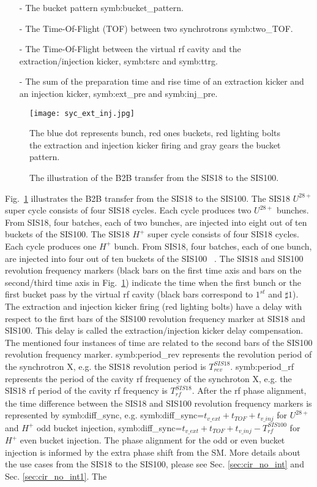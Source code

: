\begin{itemize}
\item[-] The bucket pattern \gls{symb:bucket_pattern}.
\item[-] The Time-Of-Flight (\gls{TOF}) between two synchrotrons \gls{symb:two_TOF}. 
\item[-] The Time-Of-Flight between the virtual rf cavity and the extraction/injection kicker, \gls{symb:tsrc} and \gls{symb:ttrg}. 
\item[-] The sum of the preparation time and rise time of an extraction kicker and an injection kicker, \gls{symb:ext_pre} and \gls{symb:inj_pre}.
\end{itemize}
\begin{figure}[H]
   \centering   
   \texttt{[image: syc\_ext\_inj.jpg]}
   \caption{The illustration of the B2B transfer from the SIS18 to the SIS100.}{The blue dot represents bunch, red ones buckets, red lighting bolts the extraction and injection kicker firing and gray gears the bucket pattern.}
   \label{ext_inj_kicker}
\end{figure}
Fig.~\ref{ext_inj_kicker} illustrates the B2B transfer from the SIS18 to the SIS100. The SIS18 $U^{28+}$ super cycle consists of four SIS18 cycles. Each cycle produces two $U^{28+}$ bunches. From SIS18, four batches, each of two bunches, are injected into eight out of ten buckets of the SIS100. The SIS18 $H^{+}$ super cycle consists of four SIS18 cycles. Each cycle produces one $H^{+}$ bunch. From SIS18, four batches, each of one bunch, are injected into four out of ten buckets of the SIS100 ~\cite{liebermann_fair_2013, liebermann_sis100_2013}. The SIS18 and SIS100 revolution frequency markers (black bars on the first time axis and bars on the second/third time axis in Fig.~\ref{ext_inj_kicker}) indicate the time when the first bunch or the first bucket pass by the virtual rf cavity (black bars correspond to $1^{st}$ and $\sharp1$). The extraction and injection kicker firing (red lighting bolts) have a delay with respect to the first bars of the SIS100 revolution frequency marker at SIS18 and SIS100. This delay is called the extraction/injection kicker delay compensation. The mentioned four instances of time are related to the second bars of the SIS100 revolution frequency marker. \gls{symb:period_rev} represents the revolution period of the synchrotron X, e.g. the SIS18 revolution period is $T_{\mathit{rev}}^{\mathit{SIS18}}$. \gls{symb:period_rf} represents the period of the cavity rf frequency of the synchroton X, e.g. the SIS18 rf period of the cavity rf frequency is $T_{\mathit{rf}}^{\mathit{SIS18}}$. After the rf phase alignment, the time difference between the SIS18 and SIS100 revolution frequency markers is represented by \gls{symb:diff_sync}, e.g. \gls{symb:diff_sync}=$t_{\mathit{v\_ext}}+t_{\mathit{TOF}}+t_{\mathit{v\_inj}}$ for $U^{28+}$ and $H^{+}$ odd bucket injection,  \gls{symb:diff_sync}=$t_{\mathit{v\_ext}}+t_{\mathit{TOF}}+t_{\mathit{v\_inj}}- T_{\mathit{rf}}^{\mathit{SIS100}}$ for $H^{+}$ even bucket injection. The phase alignment for the odd or even bucket injection is informed by the extra phase shift from the SM. More details about the use cases from the SIS18 to the SIS100, please see Sec. \ref{sec:cir_no_int} and Sec.  \ref{sec:cir_no_int1}. The 
